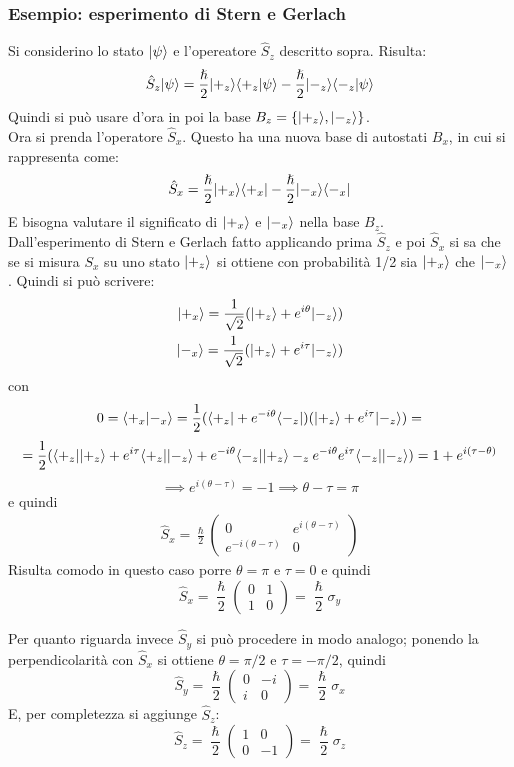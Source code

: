 \subsubsection*{Esempio: esperimento di Stern e Gerlach}
Si considerino lo stato $|\psi\rangle$ e l'opereatore $\hat S_z$ descritto sopra. Risulta:
\begin{equation*}
	\hat S_z |\psi\rangle = \frac{\hslash}{2} |+_z\rangle \langle +_z| \psi\rangle - \frac{\hslash}{2} |-_z\rangle \langle -_z| \psi\rangle
\end{equation*}
Quindi si può usare d'ora in poi la base $B_z = \{|+_z\rangle, |-_z\rangle\}$.\\
Ora si prenda l'operatore $\hat S_x$. Questo ha una nuova base di autostati $B_x$, in cui si rappresenta come:
\[
	\hat S_x = \frac{\hslash}{2} |+_x\rangle \langle +_x| - \frac{\hslash}{2} |-_x\rangle \langle -_x|
\]
E bisogna valutare il significato di $|+_x\rangle$ e $|-_x\rangle$ nella base $B_z$.\\
Dall'esperimento di Stern e Gerlach fatto applicando prima $\hat S_z$ e poi $\hat S_x$ si sa che se si misura $S_x$ su uno stato $|+_z\rangle$ si ottiene con probabilità 1/2 sia $|+_x\rangle$ che $|-_x\rangle$. Quindi si può scrivere:
\begin{align*}
	|+_x\rangle = \frac{1}{\sqrt 2} (|+_z\rangle + e^{i\theta}|-_z\rangle) \\
	|-_x\rangle = \frac{1}{\sqrt{2}} (|+_z\rangle + e^{i\tau}|-_z\rangle)
\end{align*}
con
\[
	0 = \langle +_x | -_x \rangle = \frac{1}{2} (\langle+_z| + e^{-i\theta}\langle-_z|)(|+_z\rangle + e^{i\tau}|-_z\rangle) = \]\[
	= \frac{1}{2} (\langle+_z| |+_z\rangle + e^{i\tau}\langle+_z| |-_z\rangle + e^{-i\theta}\langle-_z| |+_z\rangle -_z e^{-i\theta}e^{i\tau}\langle-_z| |-_z\rangle) = 1 + e^{i(\tau - \theta)} \]\[
	\implies e^{i(\theta - \tau)} = -1 \implies \theta - \tau = \pi
\]
e quindi
\begin{align*}
	\hat S_x = \frac{\hslash}{2} \begin{pmatrix} 0 & e^{i(\theta - \tau)} \\ e^{-i(\theta - \tau)} & 0 \end{pmatrix}
\end{align*}
Risulta comodo in questo caso porre $\theta = \pi$ e $\tau = 0$ e quindi
\[
	\hat S_x = \frac{\hslash}{2} \begin{pmatrix} 0 & 1 \\ 1 & 0 \end{pmatrix} = \frac{\hslash}{2} \sigma_y
\]

Per quanto riguarda invece $\hat S_y$ si può procedere in modo analogo; ponendo la perpendicolarità con $\hat S_x$ si ottiene $\theta = \pi/2$ e $\tau = -\pi/2$, quindi
\[
	\hat S_y = \frac{\hslash}{2} \begin{pmatrix} 0 & -i \\ i & 0 \end{pmatrix} = \frac{\hslash}{2} \sigma_x
\]
E, per completezza si aggiunge $\hat S_z$:
\[
	\hat S_z = \frac{\hslash}{2} \begin{pmatrix} 1 & 0 \\ 0 & -1 \end{pmatrix} = \frac{\hslash}{2} \sigma_z
\]

